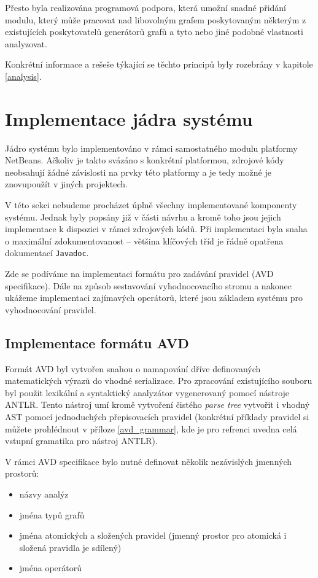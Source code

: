 Přesto byla realizována programová podpora, která umožní snadné přidání modulu, který může pracovat nad libovolným grafem poskytovaným některým z existujících poskytovatelů generátorů grafů a tyto nebo jiné podobné vlastnosti analyzovat.

Konkrétní informace a rešeše týkající se těchto principů byly rozebrány v kapitole \ref{analysis}.

\section{Implementace jádra systému}
Jádro systému bylo implementováno v rámci samostatného modulu platformy NetBeans. Ačkoliv je takto svázáno s konkrétní platformou, zdrojové kódy neobsahují žádné závislosti na prvky této platformy a je tedy možné je znovupoužít v jiných projektech.

V této sekci nebudeme procházet úplně všechny implementované komponenty systému. Jednak byly popsány již v části návrhu a kromě toho jsou jejich implementace k dispozici v rámci zdrojových kódů. Při implementaci byla snaha o maximální zdokumentovanost -- většina klíčových tříd je řádně opatřena dokumentací \verb-Javadoc-.

Zde se podíváme na implementaci formátu pro zadávání pravidel (AVD specifikace). Dále na způsob sestavování vyhodnocovacího stromu a nakonec ukážeme implementaci zajímavých operátorů, které jsou základem systému pro vyhodnocování pravidel.

\subsection{Implementace formátu AVD}
Formát AVD byl vytvořen snahou o namapování dříve definovaných matematických výrazů do vhodné serializace. Pro zpracování existujícího souboru byl použit lexikální a syntaktický analyzátor vygenerovaný pomocí nástroje ANTLR. Tento nástroj umí kromě vytvoření čistého \emph{parse tree} vytvořit i vhodný AST pomocí jednoduchých přepisovacích pravidel (konkrétní příklady pravidel si můžete prohlédnout v příloze \ref{avd_grammar}, kde je pro refrenci uvedna celá vstupní gramatika pro nástroj ANTLR).

V rámci AVD specifikace bylo nutné definovat několik nezávislých jmenných prostorů:

\begin{itemize}
\item názvy analýz
\item jména typů grafů
\item jména atomických a složených pravidel (jmenný prostor pro atomická i složená pravidla je sdílený)
\item jména operátorů
\end{itemize}

